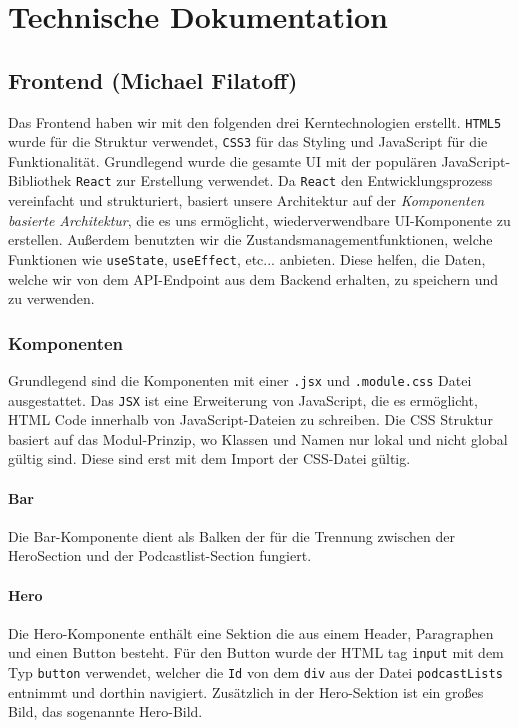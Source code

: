 \documentclass{article}
\begin{document}
\section{Technische Dokumentation}
\subsection{Frontend \small{(Michael Filatoff)}}
Das Frontend haben wir mit den folgenden drei Kerntechnologien erstellt. \texttt{HTML5} wurde für die Struktur verwendet, \texttt{CSS3} für das Styling und JavaScript für die Funktionalität. Grundlegend wurde die gesamte UI mit der populären JavaScript-Bibliothek \texttt{React} zur Erstellung verwendet. Da \texttt{React} den Entwicklungsprozess vereinfacht und strukturiert, basiert unsere Architektur auf der \textit{Komponenten basierte Architektur}, die es uns ermöglicht, wiederverwendbare UI-Komponente zu erstellen. Außerdem benutzten wir die Zustandsmanagementfunktionen, welche Funktionen wie \texttt{useState}, \texttt{useEffect}, etc... anbieten. Diese helfen, die Daten, welche wir von dem API-Endpoint aus dem Backend erhalten, zu speichern und zu verwenden.

\subsubsection{Komponenten}
Grundlegend sind die Komponenten mit einer \texttt{.jsx} und \texttt{.module.css} Datei ausgestattet. Das \texttt{JSX} ist eine Erweiterung von JavaScript, die es ermöglicht, HTML Code innerhalb von JavaScript-Dateien zu schreiben. Die CSS Struktur basiert auf das Modul-Prinzip, wo Klassen und Namen nur lokal und nicht global gültig sind. Diese sind erst mit dem Import der CSS-Datei gültig.

\paragraph{Bar}
Die Bar-Komponente dient als Balken der für die Trennung zwischen der HeroSection und der Podcastlist-Section fungiert.

\paragraph{Hero}
Die Hero-Komponente enthält eine Sektion die aus einem Header, Paragraphen und einen Button besteht. Für den Button wurde der HTML tag \texttt{input} mit dem Typ \texttt{button} verwendet, welcher die \texttt{Id} von dem \texttt{div} aus der Datei \texttt{podcastLists} entnimmt und dorthin navigiert. Zusätzlich in der Hero-Sektion ist ein großes Bild, das sogenannte Hero-Bild.
\end{document}
